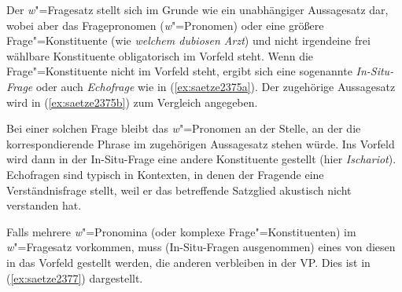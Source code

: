 \begin{exe}
  \ex\label{ex:saetze2374} 
  \begin{xlist}
  \end{xlist}
\end{exe}

\label{abs:923478} Der \textit{w}"=Fragesatz stellt sich im Grunde wie ein unabhängiger Aussagesatz dar, wobei aber das Fragepronomen (\textit{w}"=Pronomen) oder eine größere Frage"=Konstituente (wie \textit{welchem dubiosen Arzt}) und nicht irgendeine frei wählbare Konstituente obligatorisch im Vorfeld steht.
Wenn die Frage"=Konstituente nicht im Vorfeld steht, ergibt sich eine sogenannte \textit{In-Situ-Frage} oder auch \textit{Echofrage} wie in (\ref{ex:saetze2375a}).
Der zugehörige Aussagesatz wird in (\ref{ex:saetze2375b}) zum Vergleich angegeben.

\begin{exe}
  \ex\label{ex:saetze2375}
  \begin{xlist}
  \end{xlist}
\end{exe}

Bei einer solchen Frage bleibt das \textit{w}"=Pronomen an der Stelle, an der die korrespondierende Phrase im zugehörigen Aussagesatz stehen würde.
Ins Vorfeld wird dann in der In-Situ-Frage eine andere Konstituente gestellt (hier \zB \textit{Ischariot}).
Echofragen sind typisch in Kontexten, in denen der Fragende eine Verständnisfrage stellt, weil er das betreffende Satzglied \zB akustisch nicht verstanden hat.

Falls mehrere \textit{w}"=Pronomina (oder komplexe Frage"=Konstituenten) im \textit{w}"=Fragesatz vorkommen, muss (In-Situ-Fragen ausgenommen) eines von diesen in das Vorfeld gestellt werden, die anderen verbleiben in der VP.
Dies ist in (\ref{ex:saetze2377}) dargestellt.

\begin{exe}
  \ex\label{ex:saetze2377}
  \begin{xlist}
  \end{xlist}
\end{exe}

